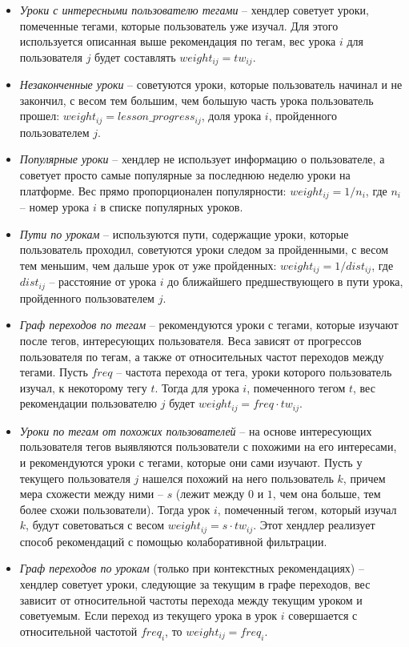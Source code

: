 \documentclass[12pt]{article}
\begin{document}
\begin{itemize}
    \item \textit{Уроки с интересными пользователю тегами} -- хендлер советует уроки, помеченные тегами, которые пользователь уже изучал. Для этого используется описанная выше рекомендация по тегам, вес урока $i$ для пользователя $j$ будет составлять $weight_{ij} = tw_{ij}$.
    \item \textit{Незаконченные уроки} -- советуются уроки, которые пользователь начинал и не закончил, с весом тем большим, чем большую часть урока пользователь прошел: $weight_{ij} = lesson\_progress_{ij}$, доля урока $i$, пройденного пользователем $j$. 
    \item \textit{Популярные уроки} -- хендлер не использует информацию о пользователе, а советует просто самые популярные за последнюю неделю уроки на платформе. Вес прямо пропорционален популярности: $weight_{ij} = 1 / n_i$, где $n_i$ -- номер урока $i$ в списке популярных уроков.
    \item \textit{Пути по урокам} -- используются пути, содержащие уроки, которые пользователь проходил, советуются уроки следом за пройденными, с весом тем меньшим, чем дальше урок от уже пройденных: $weight_{ij} = 1 / dist_{ij}$, где  $dist_{ij}$ -- расстояние от урока $i$ до ближайшего предшествующего в пути урока, пройденного пользователем $j$.
    \item \textit{Граф переходов по тегам} -- рекомендуются уроки с тегами, которые изучают после тегов, интересующих пользователя. Веса зависят от прогрессов пользователя по тегам, а также от относительных частот переходов между тегами. Пусть $freq$ -- частота перехода от тега, уроки которого пользователь изучал, к некоторому тегу $t$. Тогда для урока $i$, помеченного тегом $t$, вес рекомендации пользователю $j$ будет $weight_{ij} = freq \cdot tw_{ij}$. 
    \item \textit{Уроки по тегам от похожих пользователей} -- на основе интересующих пользователя тегов выявляются пользователи с похожими на его интересами, и рекомендуются уроки с тегами, которые они сами изучают. Пусть у текущего пользователя $j$ нашелся похожий на него пользователь $k$, причем мера схожести между ними -- $s$ (лежит между $0$ и $1$, чем она больше, тем более схожи пользователи). Тогда урок $i$, помеченный тегом, который изучал $k$, будут советоваться с весом $weight_{ij} = s \cdot tw_{ij}$. Этот хендлер реализует способ рекомендаций с помощью колаборативной фильтрации.
    \item \textit{Граф переходов по урокам} (только при контекстных рекомендациях) -- хендлер советует уроки, следующие за текущим в графе переходов, вес зависит от относительной частоты перехода между текущим уроком и советуемым. Если переход из текущего урока в урок $i$ совершается с относительной частотой $freq_i$, то  $weight_{ij} = freq_i$.

\end{itemize}
\end{document}
